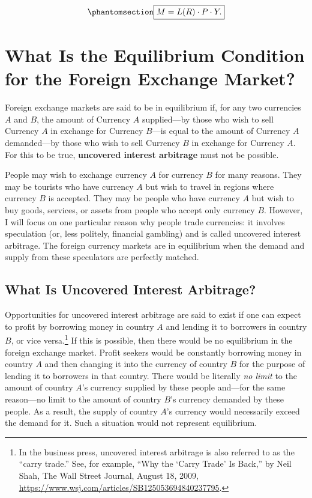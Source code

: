 \documentclass[
  letterpaper,
]{book}
\theoremstyle{plain}
\theoremstyle{remark}
\begin{document}
\begin{equation}\phantomsection\label{eq-LM}{
\fbox{$\displaystyle M=L(R)\cdot P\cdot Y.$}
}\end{equation}

\section{What Is the Equilibrium Condition for the Foreign Exchange
Market?}\label{sec-forexeqm}

Foreign exchange markets are said to be in equilibrium
 if, for any two currencies
\(A\) and \(B\), the amount of Currency \(A\) supplied---by those who
wish to sell Currency \(A\) in exchange for Currency \(B\)---is equal to
the amount of Currency \(A\) demanded---by those who wish to sell
Currency \(B\) in exchange for Currency \(A\). For this to be true,
\textbf{uncovered interest arbitrage} must not be possible.

People may wish to exchange currency \(A\) for currency \(B\) for many
reasons. They may be tourists who have currency \(A\) but wish to travel
in regions where currency \(B\) is accepted. They may be people who have
currency \(A\) but wish to buy goods, services, or assets from people
who accept only currency \(B\). However, I will focus on one particular
reason why people trade currencies: it involves speculation (or, less
politely, financial gambling) and is called uncovered interest
arbitrage. The foreign currency markets are in equilibrium when the
demand and supply from these speculators are perfectly matched.

\subsection{What Is Uncovered Interest Arbitrage?}\label{sec-UIA}

Opportunities for uncovered interest
arbitrage are said to exist if one
can expect to profit by borrowing money in country \(A\) and lending it
to borrowers in country \(B\), or vice versa.\footnote{In the business
  press, uncovered interest arbitrage is also referred to as the ``carry
  trade.'' See, for example, ``Why the `Carry Trade' Is Back,'' by Neil
  Shah, The Wall Street Journal, August 18, 2009,
  \url{https://www.wsj.com/articles/SB125053694840237795}.
  } If this is possible,
then there would be no equilibrium in the foreign exchange market.
Profit seekers would be constantly borrowing money in country \(A\) and
then changing it into the currency of country \(B\) for the purpose of
lending it to borrowers in that country. There would be literally
\emph{no limit} to the amount of country \(A\)'s currency supplied by
these people and---for the same reason---no limit to the amount of
country \(B\)'s currency demanded by these people. As a result, the
supply of country \(A\)'s currency would necessarily exceed the demand
for it. Such a situation would not represent equilibrium.
\end{document}
